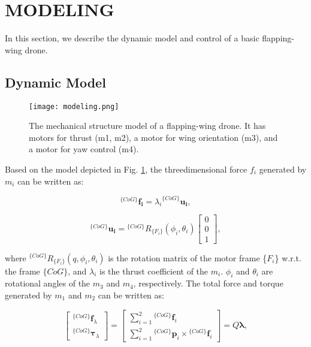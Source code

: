 \section{MODELING}

In this section, we describe the dynamic model and control of a basic flapping-wing drone.

\subsection{Dynamic Model}

\begin{figure}[t]
    \centering
    \texttt{[image: modeling.png]}
    \caption{The mechanical structure model of a flapping-wing drone. It has motors for thrust (m1, m2), a motor for wing orientation (m3), and a motor for yaw control (m4).}
    \label{figure:modeling}
  \end{figure}
  

Based on the model depicted in Fig. \ref{figure:modeling}, the threedimensional force $f_i$ generated by $m_i$ can be
written as:

\begin{equation}
    {}^{\{CoG\}}\bm{f_i} = {\lambda_i}^{\{CoG\}}\bm{u_i},
    \end{equation}
    
    \begin{equation}
    {}^{\{CoG\}}\bm{u_i} = {}^{\{CoG\}}R_{\{F_i\}}(\phi_i, \theta_i)
    \begin{bmatrix}
    0 \\
    0 \\
    1
    \end{bmatrix},
    \end{equation}
    
    where ${}^{\{CoG\}}R_{\{F_i\}}(q, \phi_i, \theta_i)$ is the rotation matrix of the motor frame
   {\{$F_i$\}} w.r.t. the frame ${\{CoG\}}$, and $\lambda_i$ is the thrust coefficient of the $m_i$. 
   $\phi_i$ and $\theta_i$ are rotational angles of the $m_3$ and $m_4$, respectively.
   The total force and torque generated by $m_1$ and $m_2$ can be written as:
    
    \begin{equation}
    \begin{bmatrix}
    {}^{\{CoG\}}\bm{f}_\lambda \\
    {}^{\{CoG\}}\bm{\tau}_\lambda
    \end{bmatrix}
    =
    \begin{bmatrix}
    \sum_{i=1}^{2} {}^{\{CoG\}}\bm{f}_i \\
    \sum_{i=1}^{2} {}^{\{CoG\}}\bm{p}_i \times {}^{\{CoG\}}\bm{f}_i
    \end{bmatrix}
    = Q\bm{\lambda},
    \end{equation}
    
